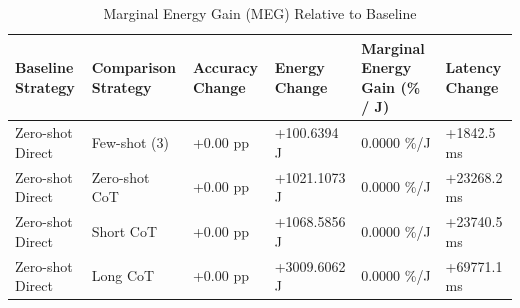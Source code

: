 \begin{table}
\caption{Marginal Energy Gain (MEG) Relative to Baseline}
\label{tab:marginal_energy_gain}
\begin{tabular}{llllll}
\toprule
Baseline Strategy & Comparison Strategy & Accuracy Change & Energy Change & Marginal Energy Gain (\% / J) & Latency Change \\
\midrule
Zero-shot Direct & Few-shot (3) & +0.00 pp & +100.6394 J & 0.0000 \%/J & +1842.5 ms \\
Zero-shot Direct & Zero-shot CoT & +0.00 pp & +1021.1073 J & 0.0000 \%/J & +23268.2 ms \\
Zero-shot Direct & Short CoT & +0.00 pp & +1068.5856 J & 0.0000 \%/J & +23740.5 ms \\
Zero-shot Direct & Long CoT & +0.00 pp & +3009.6062 J & 0.0000 \%/J & +69771.1 ms \\
\bottomrule
\end{tabular}
\end{table}
